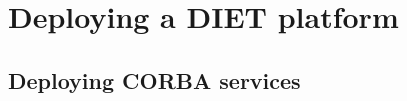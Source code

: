 
\chapter{Deploying a DIET platform}
\label{ch:deploying}


\section{Deploying CORBA services}
\label{sec:CORBA_services}

